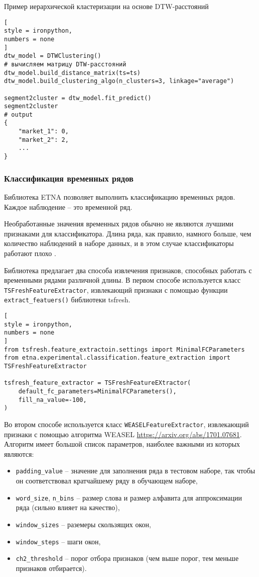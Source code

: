 \documentclass[%
	11pt,
	a4paper,
	utf8,
		]{article}
\begin{document}
Пример иерархической кластеризации на основе DTW-расстояний
\begin{lstlisting}[
style = ironpython,
numbers = none
]
dtw_model = DTWClustering()
# вычисляем матрицу DTW-расстояний
dtw_model.build_distance_matrix(ts=ts)
dtw_model.build_clustering_algo(n_clusters=3, linkage="average")

segment2cluster = dtw_model.fit_predict()
segment2cluster
# output
{
    "market_1": 0,
    "market_2": 2,
    ...
}
\end{lstlisting}

\subsubsection{Классификация временных рядов}

Библиотека ETNA позволяет выполнить классификацию временных рядов. Каждое наблюдение -- это временной ряд. 

Необработанные значения временных рядов обычно не являются лучшими признаками для классификатора. Длина ряда, как правило, намного больше, чем количество наблюдений в наборе данных, и в этом случае классификаторы работают плохо \cite[]{gruzdev:time-series-2022}.

Библиотека предлагает два способа извлечения признаков, способных работать с временными рядами различной длины. В первом способе используется класс \verb|TSFreshFeatureExtractor|, извлекающий признаки с помощью функции \verb|extract_featuers()| библиотеки tsfresh.
\begin{lstlisting}[
style = ironpython,
numbers = none
]
from tsfresh.feature_extractoin.settings import MinimalFCParameters
from etna.experimental.classification.feature_extraction import TSFreshFeatureExtractor

tsfresh_feature_extractor = TSFreshFeatureEXtractor(
    default_fc_parameters=MinimalFCParameters(),
    fill_na_value=-100,
)
\end{lstlisting}

Во втором способе используется класс \verb|WEASELFeatureExtractor|, извлекающий признаки с помощью алгоритма WEASEL \url{https://arxiv.org/abs/1701.07681}. Алгоритм имеет большой список параметров, наиболее важными из которых являются:
\begin{itemize}
	\item \verb|padding_value| -- значение для заполнения ряда в тестовом наборе, так чтобы он соответствовал кратчайшему ряду в обучающем наборе,
	
	\item \verb|word_size|, \verb|n_bins| -- размер слова и размер алфавита для аппроксимации ряда (сильно влияет на качество),
	
	\item \verb|window_sizes| -- раземеры скользящих окон,
	
	\item \verb|window_steps| -- шаги окон,
	
	\item \verb|ch2_threshold| -- порог отбора признаков (чем выше порог, тем меньше признаков отбирается). 
\end{itemize}
\end{document}
